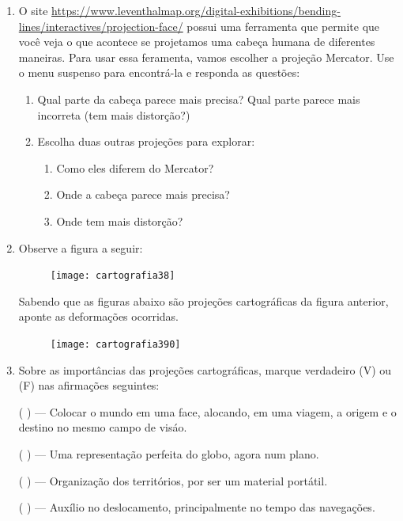 \exercise

\begin{enumerate}

\item O site \url{https://www.leventhalmap.org/digital-exhibitions/bending-lines/interactives/projection-face/} possui uma ferramenta que permite que você veja o que acontece se projetamos uma cabeça humana de diferentes maneiras.  Para usar essa feramenta, vamos escolher a projeção Mercator. Use o menu suspenso para encontrá-la e responda as questões:
\begin{enumerate}
\item Qual parte da cabeça parece mais precisa? Qual parte parece mais incorreta (tem mais distorção?)
\item Escolha duas outras projeções para explorar:
\begin{enumerate}
\item Como eles diferem do Mercator?
\item Onde a cabeça parece mais precisa?
\item  Onde tem mais distorção?
\end{enumerate}
\end{enumerate}



\item Observe a figura a seguir: 

\begin{figure}[H]
\centering
\texttt{[image: cartografia38]}
\end{figure}

Sabendo que as figuras abaixo são projeções cartográficas da figura anterior, aponte as deformações ocorridas.

\begin{figure}[H]
\centering
\texttt{[image: cartografia390]}
\end{figure}


\item Sobre as importâncias das projeções cartográficas, marque verdadeiro (V) ou (F) nas afirmações seguintes:

({ }{ }{ }) --- Colocar o mundo em uma face, alocando, em uma viagem, a origem e o destino no mesmo campo de visáo.

({ }{ }{ }) --- Uma representação perfeita do globo, agora num plano.

({ }{ }{ }) --- Organização dos territórios, por ser um material portátil.

({ }{ }{ }) --- Auxílio no deslocamento, principalmente no tempo das navegações.


\end{enumerate}

